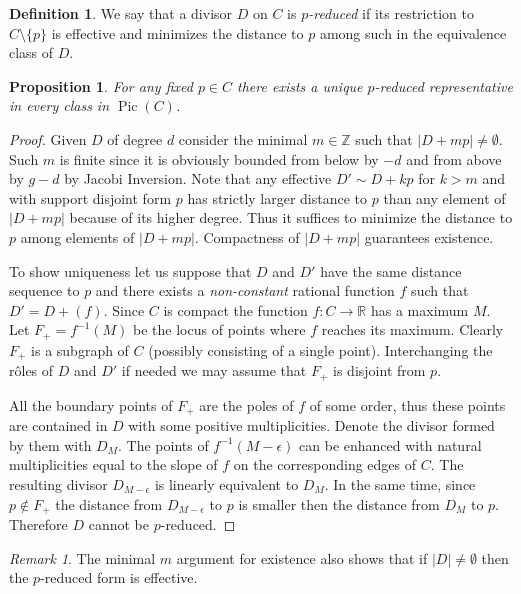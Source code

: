 \documentclass[12pt]{amsart}
\theoremstyle{plain}
\newtheorem{proposition}[theorem]{Proposition}
\theoremstyle{definition}
\newtheorem{definition}[theorem]{Definition}
\theoremstyle{remark}
\newtheorem*{remark}{Remark}
\newcommand{\Z}{\mathbb Z}    %
\newcommand{\R}{\mathbb R}    %
\newcommand{\<}{\langle}   %
\renewcommand{\>}{\rangle} %
\newcommand{\Pic}{\operatorname{Pic}}
\begin{document}
\begin{definition}
We say that a divisor $D$ on $C$ is {\em $p$-reduced}
if its restriction to $C\setminus\{p\}$ is effective and
minimizes the distance to $p$ among such in the equivalence class of $D$.
\end{definition}

\begin{proposition}\label{p-unique}
For any fixed $p\in C$ there exists a unique $p$-reduced representative in every class in $\Pic(C)$.
\end{proposition}
\begin{proof}
Given $D$ of degree $d$ consider the minimal $m\in\Z$ such that $|D+mp|\ne \emptyset$.
Such $m$ is finite since it is obviously bounded from below by $-d$ and from above by $g-d$ by Jacobi Inversion.
Note that any effective $D'\sim D+kp$ for $k>m$ and with support disjoint form $p$ has strictly larger distance to $p$ than any element of $|D+mp|$ because of its higher degree.
Thus it suffices to minimize the distance to $p$ among elements of $|D+mp|$. Compactness of  $|D+mp|$ guarantees existence.

To show uniqueness let us suppose
that $D$ and $D'$ have the same distance sequence to $p$ and
there exists a {\em non-constant} rational function $f$ such that
$D'=D+(f)$. Since $C$ is compact the function $f:C\to\R$ has a maximum $M$.
Let $F_+=f^{-1}(M)$ be the locus of points where $f$ reaches its maximum.
Clearly $F_+$ is a subgraph of $C$ (possibly consisting of a single point).
Interchanging the r\^oles of $D$ and $D'$ if needed we may
assume that $F_+$ is disjoint from $p$.

All the boundary points of $F_+$ are the poles of $f$ of some order, thus these points are contained in $D$ with some positive multiplicities. Denote the divisor formed by them with $D_M$.
The points of $f^{-1}(M-\epsilon)$ can be enhanced with natural multiplicities
equal to the slope of $f$ on the corresponding edges of $C$. The resulting divisor
$D_{M-\epsilon}$ is linearly equivalent to $D_M$. In the same time, since $p\notin F_+$
the distance from $D_{M-\epsilon}$ to $p$ is smaller then the distance from $D_M$ to $p$.
Therefore $D$ cannot be $p$-reduced.
\end{proof}

\begin{remark}
The minimal $m$ argument for existence also shows that if $|D|\ne\emptyset$ then the $p$-reduced form is effective.
\end{remark}
\end{document}
